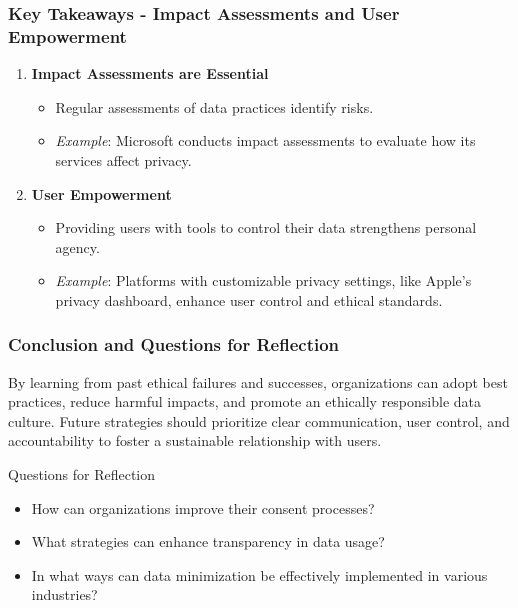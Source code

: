 \documentclass[aspectratio=169]{beamer}
\begin{document}
\begin{frame}[fragile]
    \frametitle{Key Takeaways - Impact Assessments and User Empowerment}
    \begin{enumerate}
        \item \textbf{Impact Assessments are Essential}
        \begin{itemize}
            \item Regular assessments of data practices identify risks.
            \item \textit{Example}: Microsoft conducts impact assessments to evaluate how its services affect privacy.
        \end{itemize}
        
        \item \textbf{User Empowerment}
        \begin{itemize}
            \item Providing users with tools to control their data strengthens personal agency.
            \item \textit{Example}: Platforms with customizable privacy settings, like Apple’s privacy dashboard, enhance user control and ethical standards.
        \end{itemize}
    \end{enumerate}
\end{frame}

\begin{frame}[fragile]
    \frametitle{Conclusion and Questions for Reflection}
    By learning from past ethical failures and successes, organizations can adopt best practices, reduce harmful impacts, and promote an ethically responsible data culture. Future strategies should prioritize clear communication, user control, and accountability to foster a sustainable relationship with users.

    \begin{block}{Questions for Reflection}
        \begin{itemize}
            \item How can organizations improve their consent processes?
            \item What strategies can enhance transparency in data usage?
            \item In what ways can data minimization be effectively implemented in various industries?
        \end{itemize}
    \end{block}
\end{frame}
\end{document}
